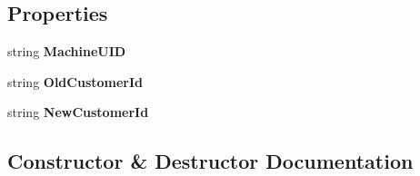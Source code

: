 \subsection*{Properties}
\begin{DoxyCompactItemize}
\item 
string {\bfseries Machine\+U\+ID}\hypertarget{class_products_1_1_data_1_1_event_system_1_1_machine_changed_event_args_a039066a4402ebeb261f1b4fe996924b2}{}\label{class_products_1_1_data_1_1_event_system_1_1_machine_changed_event_args_a039066a4402ebeb261f1b4fe996924b2}

\item 
string {\bfseries Old\+Customer\+Id}\hypertarget{class_products_1_1_data_1_1_event_system_1_1_machine_changed_event_args_a2451b648b629318c3b4a6cf869013e85}{}\label{class_products_1_1_data_1_1_event_system_1_1_machine_changed_event_args_a2451b648b629318c3b4a6cf869013e85}

\item 
string {\bfseries New\+Customer\+Id}\hypertarget{class_products_1_1_data_1_1_event_system_1_1_machine_changed_event_args_afc11c2478eba1605a6b4d13fbddcac7a}{}\label{class_products_1_1_data_1_1_event_system_1_1_machine_changed_event_args_afc11c2478eba1605a6b4d13fbddcac7a}

\end{DoxyCompactItemize}


\subsection{Constructor \& Destructor Documentation}
